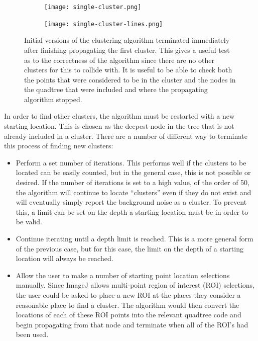 \begin{figure}[tbhp]
	\centering
	\begin{subfigure}[c]{4.2cm}
		\texttt{[image: single-cluster.png]}
		\caption{}\label{fig:single-cluster-points}
	\end{subfigure}%
	\quad
	\begin{subfigure}[c]{4.2cm}
		\texttt{[image: single-cluster-lines.png]}
		\caption{}\label{fig:single-cluster-lines}
	\end{subfigure}

	\caption[Propagation of a single starting location.]{Initial versions of
		the clustering algorithm terminated immediately after finishing
		propagating the first cluster. This gives a useful test as to the
		correctness of the algorithm since there are no other clusters for this
		to collide with. It is useful to be able to check both
		 the points that were considered to
		be in the cluster and  the nodes in
		the quadtree that were included and where the propagating algorithm
		stopped.}\label{fig:single-cluster}
\end{figure}

In order to find other clusters, the algorithm must be restarted with a new
starting location. This is chosen as the deepest node in the tree that is not
already included in a cluster. There are a number of different way to terminate
this process of finding new clusters:

\begin{itemize}

	\item Perform a set number of iterations. This performs well if the
		clusters to be located can be easily counted, but in the general case,
		this is not possible or desired. If the number of iterations is set to
		a high value, of the order of 50, the algorithm will continue to locate
		``clusters'' even if they do not exist and will eventually simply
		report the background noise as a cluster. To prevent this, a limit can
		be set on the depth a starting location must be in order to be valid.

	\item Continue iterating until a depth limit is reached. This is a more
		general form of the previous case, but for this case, the limit on the
		depth of a starting location will always be reached.

	\item Allow the user to make a number of starting point location selections
		manually. Since ImageJ allows multi-point region of interest (ROI)
		selections, the user could be asked to place a new ROI at the places
		they consider a reasonable place to find a cluster. The algorithm would
		then convert the locations of each of these ROI points into the
		relevant quadtree code and begin propagating from that node and
		terminate when all of the ROI's had been used.

\end{itemize}

